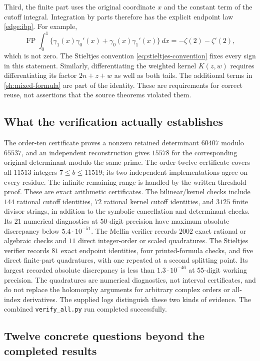 \documentclass[11pt,letterpaper]{article}
\numberwithin{equation}{section}
\theoremstyle{definition}
\theoremstyle{remark}
\DeclareMathOperator{\FP}{FP}
\begin{document}
Third, the finite part uses the original coordinate $x$ and the
constant term of the cutoff integral. Integration by parts therefore
has the explicit endpoint law \eqref{edge:ibp}. For example,
\[
 \FP\int_0^1\bigl\{
   \gamma_1(x)\gamma_0'(x)+\gamma_0(x)\gamma_1'(x)
   \bigr\}\,dx=-\zeta(2)-\zeta'(2),
\]
which is not zero. The Stieltjes convention
\eqref{eq:stieltjes-convention} fixes every sign in this statement.
Similarly, differentiating the weighted kernel $K(z,w)$ requires
differentiating its factor $2n+z+w$ as well as both tails. The
additional terms in \eqref{sh:mixed-formula} are part of the identity.
These are requirements for correct reuse, not assertions that the
source theorems violated them.

\subsection{What the verification actually establishes}

The order-ten certificate proves a nonzero retained determinant
$60407$ modulo $65537$, and an independent reconstruction gives
$15578$ for the corresponding original determinant modulo the same
prime. The order-twelve certificate covers all $11513$ integers
$7\le b\le11519$; its two independent implementations agree on every
residue. The infinite remaining range is handled by the written
threshold proof. These are exact arithmetic certificates. The
bilinear/kernel checks include $144$ rational cutoff identities,
$72$ rational kernel cutoff identities, and $3125$ finite divisor
strings, in addition to the symbolic cancellation and determinant
checks. Its $21$ numerical diagnostics at $50$-digit precision have
maximum absolute discrepancy below $5.4\cdot10^{-51}$.
The Mellin verifier records $2002$ exact rational or algebraic
checks and $11$ direct integer-order or scaled quadratures. The
Stieltjes verifier records $81$ exact endpoint identities, four
printed-formula checks, and five direct finite-part quadratures,
with one repeated at a second splitting point. Its largest recorded
absolute discrepancy is less than $1.3\cdot10^{-46}$ at $55$-digit
working precision. The quadratures are numerical diagnostics, not
interval certificates, and do not replace the holomorphy arguments
for arbitrary complex orders or all-index derivatives. The supplied
logs distinguish these two kinds of evidence. The combined
\texttt{verify\_all.py} run completed successfully.

\subsection{Twelve concrete questions beyond the completed results}
\end{document}
